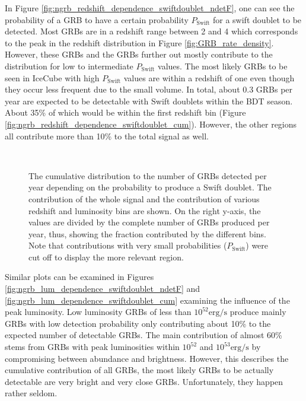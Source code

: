 In Figure \ref{fig:ngrb_redshift_dependence_swiftdoublet_ndetF}, one can see 
the probability of a GRB to have a certain probability $P_\mathrm{Swift}$ for a 
swift doublet to be detected. Most GRBs are in a redshift range between 2 and 4 
which corresponds to the peak in the redshift distribution in Figure 
\ref{fig:GRB_rate_density}. However, these GRBs and the GRBs further out mostly 
contribute to the distribution for low to intermediate $P_\mathrm{Swift}$ 
values. The most likely GRBs to be seen in IceCube with high $P_\mathrm{Swift}$ 
values are within a redshift of one even though they occur less frequent due 
to the small volume. In total, about 0.3 GRBs per year are expected to be 
detectable with Swift doublets within the BDT season. About 35\% of which would 
be within the first redshift bin (Figure 
\ref{fig:ngrb_redshift_dependence_swiftdoublet_cum}). However, the other 
regions all contribute more than 10\% to the total signal as well.

\begin{figure}[h]
\centering
 \captionsetup{width=.9\textwidth}
\\
\caption{The cumulative distribution to the number of GRBs detected 
per year depending on the probability to produce a Swift doublet. The 
contribution of the whole signal and the contribution of 
various redshift and luminosity bins are shown. On the right 
y-axis, the values are divided by the complete number of GRBs produced per 
year, thus, showing the fraction contributed by the different bins. Note that 
contributions with very small 
probabilities ($P_\mathrm{Swift}$) were cut off to display the more relevant 
region.}
\end{figure}

Similar plots can be examined in Figures 
\ref{fig:ngrb_lum_dependence_swiftdoublet_ndetF} and 
\ref{fig:ngrb_lum_dependence_swiftdoublet_cum} examining the influence of the 
peak luminosity. Low luminosity GRBs of less than $10^{52}\mathrm{ erg / s}$ 
produce mainly GRBs with low detection probability only contributing about 10\% 
to the expected number of detectable GRBs. The main contribution of almost 60\% 
stems from GRBs with peak luminosities within $10^{52}$ and 
$10^{53}\mathrm{erg/s}$ by compromising between abundance and brightness. 
However, this describes the cumulative contribution of all GRBs, the most 
likely GRBs to be actually detectable are very bright and very close GRBs. 
Unfortunately, they happen rather seldom.

